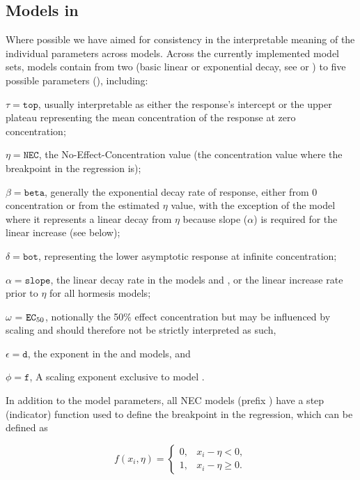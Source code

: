 \documentclass[
  shortnames]{jss}
\begin{document}
\subsection[Models in bayesnec]{Models in }\label{mdbnc}

Where possible we have aimed for consistency in the interpretable meaning of the individual parameters across models. Across the currently implemented model sets, models contain from two (basic linear or exponential decay, see  or ) to five possible parameters (), including:

\(\tau = \mathtt{top}\), usually interpretable as either the response's intercept or the upper plateau representing the mean concentration of the response at zero concentration;

\(\eta = \mathtt{NEC}\), the No-Effect-Concentration value (the concentration value where the breakpoint in the regression is);

\(\beta = \mathtt{beta}\), generally the exponential decay rate of response, either from 0 concentration or from the estimated \(\eta\) value, with the exception of the  model where it represents a linear decay from \(\eta\) because slope (\(\alpha\)) is required for the linear increase (see below);

\(\delta = \mathtt{bot}\), representing the lower asymptotic response at infinite concentration;

\(\alpha = \mathtt{slope}\), the linear decay rate in the models  and , or the linear increase rate prior to \(\eta\) for all hormesis models;

\(\omega\) = \(\mathtt{EC\textsubscript{50}}\), notionally the 50\% effect concentration but may be influenced by scaling and should therefore not be strictly interpreted as such,

\(\epsilon = \mathtt{d}\), the exponent in the  and  models, and

\(\phi = \mathtt{f}\), A scaling exponent exclusive to model .

In addition to the model parameters, all NEC models (prefix ) have a step (indicator) function used to define the breakpoint in the regression, which can be defined as

\[
f(x_i, \eta) = \begin{cases} 
      0, & x_i - \eta < 0, \\
      1, & x_i - \eta \geq 0.
   \end{cases}
\]
\end{document}
